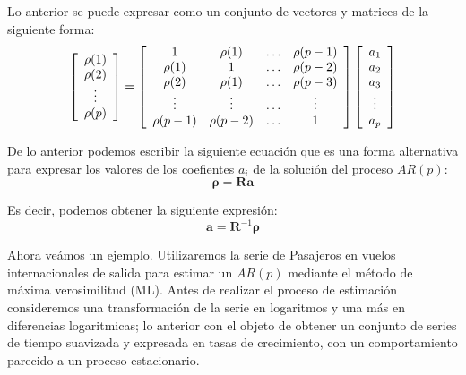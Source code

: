 \documentclass[
]{book}
\begin{document}
Lo anterior se puede expresar como un conjunto de vectores y matrices de la siguiente forma:
\begin{equation}
    \left[ 
    \begin{array}{c}
        \rho(1) \\
        \rho(2) \\
        \vdots \\
        \rho(p)
    \end{array} 
    \right]
    = 
    \left[ 
    \begin{array}{c c c c}
        1 & \rho(1) & \ldots & \rho(p - 1) \\
        \rho(1) & 1 & \ldots & \rho(p - 2) \\
        \rho(2) & \rho(1) & \ldots & \rho(p - 3) \\
        \vdots & \vdots & \ldots & \vdots \\
        \rho(p - 1) & \rho(p - 2) & \ldots & 1 \\
    \end{array} 
    \right]
    \left[ 
    \begin{array}{c}
        a_1 \\
        a_2 \\
        a_3 \\
        \vdots \\
        a_p \\
    \end{array} 
    \right]
\end{equation}

De lo anterior podemos escribir la siguiente ecuación que es una forma alternativa para expresar los valores de los coefientes \(a_i\) de la solución del proceso \(AR(p)\):
\begin{equation}
    \boldsymbol{\rho} = \mathbf{R} \mathbf{a}
\end{equation}

Es decir, podemos obtener la siguiente expresión:
\begin{equation}
    \mathbf{a} = \mathbf{R}^{-1} \boldsymbol{\rho}
\end{equation}

Ahora veámos un ejemplo. Utilizaremos la serie de Pasajeros en vuelos internacionales de salida para estimar un \(AR(p)\) mediante el método de máxima verosimilitud (ML). Antes de realizar el proceso de estimación consideremos una transformación de la serie en logaritmos y una más en diferencias logaritmicas; lo anterior con el objeto de obtener un conjunto de series de tiempo suavizada y expresada en tasas de crecimiento, con un comportamiento parecido a un proceso estacionario.
\end{document}
